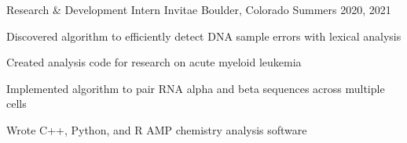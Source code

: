 \begin{cventries}
  \cventry
    {Research \& Development Intern}
    {Invitae}
    {Boulder, Colorado}
    {Summers 2020, 2021}
    {
      \begin{cvitems}
        \item {Discovered algorithm to efficiently detect DNA sample errors with lexical analysis}
        \item {Created analysis code for research on acute myeloid leukemia}
        \item {Implemented algorithm to pair RNA alpha and beta sequences across multiple cells}
        \item {Wrote C++, Python, and R AMP chemistry analysis software}
      \end{cvitems}
    }
  

%    


\end{cventries}
